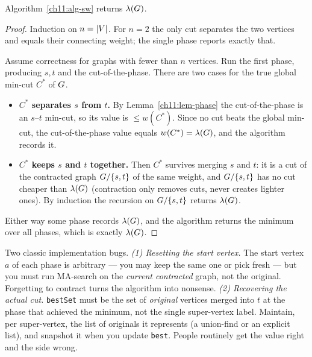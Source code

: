 \begin{theorem}\label{ch11:thm-sw}
Algorithm~\ref{ch11:alg-sw} returns $\lambda(G)$.
\end{theorem}

\begin{proof}
Induction on $n=\lvert V\rvert$. For $n=2$ the only cut separates the two vertices and equals their connecting weight; the single phase reports exactly that.

Assume correctness for graphs with fewer than $n$ vertices. Run the first phase, producing $s,t$ and the cut-of-the-phase. There are two cases for the true global min-cut $C^\ast$ of $G$.
\begin{itemize}
  \item \textbf{$C^\ast$ separates $s$ from $t$.} By Lemma~\ref{ch11:lem-phase} the cut-of-the-phase is an $s$--$t$ min-cut, so its value is $\le w(C^\ast)$. Since no cut beats the global min-cut, the cut-of-the-phase value equals $w(C^\ast)=\lambda(G)$, and the algorithm records it.
  \item \textbf{$C^\ast$ keeps $s$ and $t$ together.} Then $C^\ast$ survives merging $s$ and $t$: it is a cut of the contracted graph $G/\{s,t\}$ of the same weight, and $G/\{s,t\}$ has no cut cheaper than $\lambda(G)$ (contraction only removes cuts, never creates lighter ones). By induction the recursion on $G/\{s,t\}$ returns $\lambda(G)$.
\end{itemize}
Either way some phase records $\lambda(G)$, and the algorithm returns the minimum over all phases, which is exactly $\lambda(G)$.
\end{proof}

\begin{trapbox}
Two classic implementation bugs.
\emph{(1) Resetting the start vertex.} The start vertex $a$ of each phase is arbitrary --- you may keep the same one or pick fresh --- but you must run MA-search on the \emph{current contracted} graph, not the original. Forgetting to contract turns the algorithm into nonsense.
\emph{(2) Recovering the actual cut.} \texttt{bestSet} must be the set of \emph{original} vertices merged into $t$ at the phase that achieved the minimum, not the single super-vertex label. Maintain, per super-vertex, the list of originals it represents (a union-find or an explicit list), and snapshot it when you update \texttt{best}. People routinely get the value right and the side wrong.
\end{trapbox}

